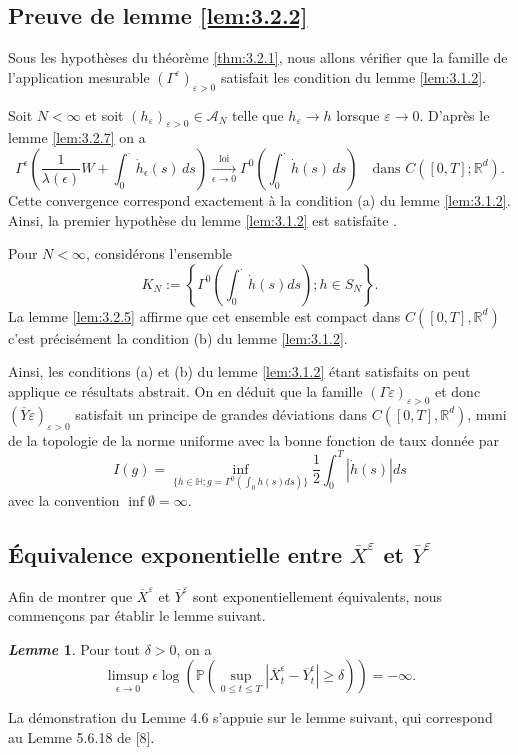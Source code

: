\documentclass[12pt,a4paper,twoside]{report}%
\theoremstyle{definition}
\newtheorem{lem}[dfn]{\textit{Lemme}}
\numberwithin{equation}{section}
\begin{document}
\subsection*{Preuve de lemme \ref{lem:3.2.2}}
Sous les hypothèses du théorème \ref{thm:3.2.1}, nous allons vérifier que la famille de l'application mesurable $(\Gamma^\varepsilon)_{\varepsilon>0}$ satisfait les condition du lemme \ref{lem:3.1.2}.

Soit $N	<\infty$ et soit $(h_\varepsilon)_{\varepsilon>0}\in \mathscr{A}_N$ telle que $h_\varepsilon\to h$ lorsque $ \varepsilon\to 0$.
D'après le lemme \ref{lem:3.2.7} on a
\[
\Gamma^\epsilon\left( \frac{1}{\lambda(\epsilon)} W + \int_0^{\cdot} \dot{h}_\epsilon(s)\, ds \right)
\xrightarrow[\epsilon \to 0]{\text{loi}}
\Gamma^{0}\left( \int_0^{\cdot} \dot{h}(s)\, ds \right)
\quad \text{dans } C([0,T];\mathbb{R}^d).
\]
Cette convergence correspond exactement à la condition (a) du lemme \ref{lem:3.1.2}.
Ainsi, la premier hypothèse du lemme \ref{lem:3.1.2} est satisfaite	.

Pour $N<\infty$, considérons l'ensemble
	\[K_N := \left\{ \Gamma^0 \left( \int_0^{\cdot} \dot{h}(s) ds \right); h \in S_N \right\}.\]
La lemme \ref{lem:3.2.5} affirme que cet ensemble est compact dans $C([0,T],\mathbb{R}^d)$ c'est précisément la condition (b) du lemme \ref{lem:3.1.2}.

Ainsi, les conditions (a) et (b) du lemme \ref{lem:3.1.2} étant satisfaits on peut applique ce résultats abstrait.
On en déduit que la famille $(\Gamma\varepsilon)_{\varepsilon>0}$ et donc $(\overline{Y}\varepsilon)_{\varepsilon>0}$ satisfait un principe de grandes déviations dans $C([0,T],\mathbb{R}^d)$, muni de la topologie de la norme uniforme avec la bonne fonction de taux donnée par
\[
I(g) = \inf_{\{h \in \mathbb{H}; g = \Gamma^0 (\int_{0}^{.} h(s) ds)\}}\frac{1}{2}\int_{0}^{T}|\dot{h}(s)|ds
\]
	 avec la convention \( \inf \emptyset = \infty \).
	 \subsection{Équivalence exponentielle entre $\overline{X}^\varepsilon$ et $\overline{Y}^\varepsilon$}
	 Afin de montrer que $\overline{X}^\varepsilon$ et $\overline{Y}^\varepsilon$ sont exponentiellement équivalents, nous commençons par établir le lemme suivant.
	 \begin{lem}\label{lem:3.2.8}
	 	Pour tout \(\delta > 0\), on a
	 	\begin{equation}\label{eq:3.2.11}
	 		\limsup_{\epsilon \to 0} \epsilon \log \left( \mathbb{P}\left( \sup_{0 \leq t \leq T} |\overline{X}_t^\epsilon - \overline{Y}^\epsilon_t| \geq \delta \right) \right) = -\infty.
	 	\end{equation}
	 \end{lem}
	 	La démonstration du Lemme 4.6 s’appuie sur le lemme suivant, qui correspond au Lemme 5.6.18 de [8].
	 	
\end{document}

